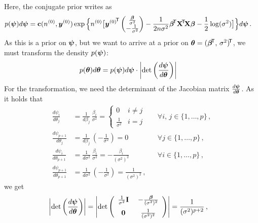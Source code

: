Here, the conjugate prior writes as
\begin{align*}
p(\boldsymbol{\psi}) d\boldsymbol{\psi} &= \mathbf{c}(n^{(0)}, {\bm y}^{(0)}) \exp\Big\{ n^{(0)} \big[ {{\bm y}^{(0)}}^{{\mbox{\!\scriptsize\textsf{T}}}} \begin{pmatrix} \frac{\boldsymbol{\beta}}{\sigma^2} \\
                                                                                      -\frac{1}{\sigma^2} \end{pmatrix}
                                                -\frac{1}{2n\sigma^2} \boldsymbol{\beta}^{{\mbox{\!\scriptsize\textsf{T}}}} \mathbf{X}^{{\mbox{\!\scriptsize\textsf{T}}}} \! \mathbf{X} \boldsymbol{\beta}
                                                -\frac{1}{2} \log(\sigma^2) \big]\Big\} d\boldsymbol{\psi}\,.
\end{align*}
As this is a prior on $\boldsymbol{\psi}$, but we want to arrive at a prior on $\boldsymbol{\theta} = (\boldsymbol{\beta}^{{\mbox{\!\scriptsize\textsf{T}}}},\, \sigma^2)^{{\mbox{\!\scriptsize\textsf{T}}}}$,
we must transform the density $p(\boldsymbol{\psi})$:
\begin{align*}
p(\boldsymbol{\theta}) d\boldsymbol{\theta} &= p(\boldsymbol{\psi}) d\boldsymbol{\psi} \cdot \left| \mbox{det}\left( \frac{d\boldsymbol{\psi}}{d\boldsymbol{\theta}} \right) \right|
\end{align*}
For the transformation, we need the determinant of the Jacobian matrix $\frac{d\boldsymbol{\psi}}{d\boldsymbol{\theta}}$. 
As it holds that
\begin{align*}
\frac{d\psi_i}{d\theta_j}         &= \frac{1}{d\beta_j}\, \frac{\beta_i}{\sigma^2}
                                   = \begin{cases} 0                  & i \neq j \\
                                                   \frac{1}{\sigma^2} & i = j \end{cases}      & &\forall i,\, j \in \{1,\ldots,p\}\,,\\
\frac{d\psi_{p+1}}{d\theta_j}     &= \frac{1}{d\beta_j}\, \left(-\frac{1}{\sigma^2}\right) = 0 & &\forall j \in \{1,\ldots,p\}\,,\\
\frac{d\psi_i}{d\theta_{p+1}}     &= \frac{1}{d\sigma^2}\, \frac{\beta_i}{\sigma^2} = -\frac{\beta_i}{(\sigma^2)^2} & &\forall i \in \{1,\ldots,p\}\,,\\
\frac{d\psi_{p+1}}{d\theta_{p+1}} &= \frac{1}{d\sigma^2} \, \left(-\frac{1}{\sigma^2}\right)
                                   = \frac{1}{(\sigma^2)^{2}}\,,
\end{align*}
we get
\begin{align*}
\left| \mbox{det}\left( \frac{d\bpsi}{d\btheta} \right) \right| &=
\left| \mbox{det}\left(\begin{array}{cc} \frac{1}{\sigma^2} \mbf{I} &\; -\frac{\bbeta}{(\sigma^2)^{2}} \\[1.5ex] %
                                         \mbf{0}                    &\;  \frac{1}{(\sigma^2)^{2}} \end{array}\right) \right|
 = \frac{1}{(\sigma^2)^{p+2}}\,,
\end{align*}
